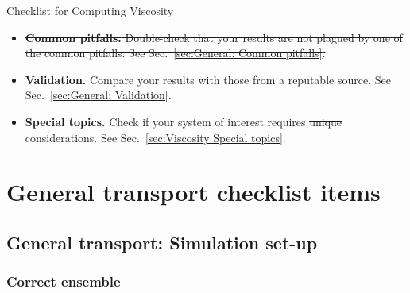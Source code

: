 \documentclass[9pt,bestpractices]{livecoms}
\providecommand{\DIFadd}[1]{{\protect\color{blue}\uwave{#1}}} %
\providecommand{\DIFdel}[1]{{\protect\color{red}\sout{#1}}}                      %
\providecommand{\DIFaddbegin}{} %
\providecommand{\DIFaddend}{} %
\providecommand{\DIFdelbegin}{} %
\providecommand{\DIFdelend}{} %
\begin{document}
\begin{Checklists*}[p!]
\begin{checklist}{Checklist for Computing Viscosity}
\begin{itemize}
			\item \DIFdelbegin \DIFdel{
			\textbf{Common pitfalls.} Double-check that your results are not plagued by one of the common pitfalls. See Sec.\ \ref{sec:General: Common pitfalls}.}\DIFdelend
			
			\item
			\textbf{Validation.} Compare your results with those from a reputable source. See Sec.\ \ref{sec:General: Validation}.
			
			\item
			\textbf{Special topics.} Check if your system of interest requires \DIFdelbegin \DIFdel{unique }\DIFdelend \DIFaddbegin \DIFadd{some special }\DIFaddend considerations. See Sec.\ \ref{sec:Viscosity Special topics}.
			
		\end{itemize}
	\end{checklist}
\end{Checklists*}

\DIFaddbegin \normalsize


\DIFaddend \section{General transport checklist items} \label{sec:General}

\subsection{General transport: Simulation set-up} \label{sec:General Simulation Setup}

\subsubsection{Correct ensemble} \label{sec:General: Correct Ensemble}
\end{document}
